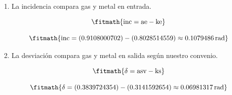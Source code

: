 \begin{enumerate}

\item La incidencia compara gas y metal en entrada.

\[\fitmath{\mathrm{inc}=\mathrm{ae}-\mathrm{ke}}\]

\[\fitmath{\mathrm{inc}=(0.9108000702)-(0.8028514559)\approx 0.1079486\,\mathrm{rad}}\]

\item La desviación compara gas y metal en salida según nuestro convenio.

\[\fitmath{\delta=\mathrm{asv}-\mathrm{ks}}\]

\[\fitmath{\delta=(0.3839724354)-(0.3141592654)\approx 0.06981317\,\mathrm{rad}}\]

\end{enumerate}
